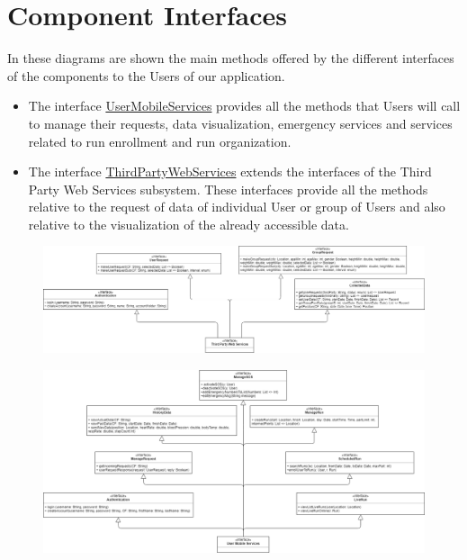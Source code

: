 \section{Component Interfaces}
In these diagrams are shown the main methods offered by the different interfaces of the components to the Users of our application.

\begin{itemize}
    \item  The interface \underline{UserMobileServices} provides all the methods that Users will call to manage their requests, data visualization, emergency services and services related to run enrollment and run organization.
    \item The interface \underline{ThirdPartyWebServices} extends the interfaces of the Third Party Web Services subsystem. These interfaces provide all the methods relative to the request of data of individual User or group of Users and also relative to the visualization of the already accessible data.
   \end{itemize}

\begin{figure}[H]

    \centering
    \includegraphics[scale=0.32]{./Pictures/compInterfDiagThirdPDD.png}
   
\end{figure}

\begin{figure}[H]

    \centering
    \includegraphics[scale=0.35]{./Pictures/compInterfDiagUserDD.png}
   
\end{figure}
